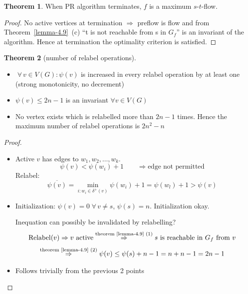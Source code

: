 \documentclass[a4paper]{article}
\theoremstyle{definition}
\newtheorem{theorem}{Theorem}
\newcommand{\flow}[2]{$#1$-$#2$-flow}
\newcommand{\fall}{\;\forall\,}
\begin{document}
\begin{theorem}\label{satz-4.10}
  When PR algorithm terminates, $f$ is a maximum \flow st.
\end{theorem}

\begin{proof}
  No active vertices at termination $\Rightarrow$ preflow is flow and from Theorem~\ref{lemma-4.9}~(c) ``t is not reachable from s in $G_f$'' is an invariant of the algorithm. Hence at termination the optimality criterion is satisfied.
\end{proof}

\begin{theorem}[number of relabel operations]
  \label{lemma-4.11}
  \begin{itemize}
    \item $\fall v \in V(G): \psi(v)$ is increased in every relabel operation by at least one (strong monotonicity, no decrement)
    \item $\psi(v) \leq 2n - 1$ is an invariant $\forall v \in V(G)$
    \item No vertex exists which is relabelled more than $2n - 1$ times. Hence the maximum number of relabel operations is $2n^2 - n$
  \end{itemize}
\end{theorem}

\begin{proof}
  \begin{itemize}
    \item Active $v$ has edges to $w_1, w_2, \ldots, w_k$.
      \[ \psi(v) < \psi(w_i) + 1 \qquad \Rightarrow \text{edge not permitted} \]
      Relabel:
      \[ \overline{\psi(v)} = \min_{i: w_i \in \delta^+(v)} \psi(w_i) + 1 = \psi(w_l) + 1 > \psi(v) \]
    \item Initialization: $\psi(v) = 0 \fall v \neq s$, $\psi(s) = n$. Initialization okay.

      Inequation can possibly be invalidated by relabelling?
      \[
        \operatorname{Relabel}(v)
          \Rightarrow v \text{ active}
          \stackrel{\text{theorem~\ref{lemma-4.9} (1)}}{\Rightarrow} s \text{ is reachable in $G_f$ from } v
      \] \[
        \stackrel{\text{theorem~\ref{lemma-4.9} (2)}}{\Rightarrow}
          \psi(v) \leq \psi(s) + n - 1
          = n + n - 1 = 2n - 1
      \]
    \item Follows trivially from the previous 2 points
  \end{itemize}
\end{proof}
\end{document}
